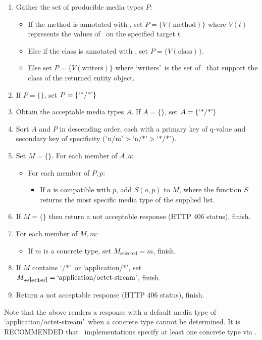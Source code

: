 \begin{enumerate}
\item Gather the set of producible media types $P$:
\begin{itemize}
\item If the method is annotated with \ProduceMime, set $P = \{ V(\mbox{method}) \}$ where $V(t)$ represents the values of \ProduceMime\ on the specified target $t$.
\item Else if the class is annotated with \ProduceMime, set $P = \{ V(\mbox{class}) \}$.
\item Else set $P = \{ V(\mbox{writers}) \}$ where \lq writers\rq\ is the set of \MsgWrite\ that support the class of the returned entity object.
\end{itemize}

\item If $P = \{\}$, set $P = \{\mbox{\lq*/*\rq}\}$

\item Obtain the acceptable media types $A$. If $A = \{\}$, set $A = \{\mbox{\lq*/*\rq}\}$

\item Sort $A$ and $P$ in descending order, each with a primary key of q-value and secondary key of specificity ($\mbox{\lq n/m\rq} > \mbox{\lq n/*\rq} > \mbox{\lq*/*\rq}$).

\item Set $M=\{\}$. For each member of $A, a$:
\begin{itemize}
\item For each member of $P, p$:
\begin{itemize}
\item If $a$ is compatible with $p$, add $S(a,p)$ to $M$, where the function $S$ returns the most specific media type of the supplied list.
\end{itemize}
\end{itemize}

\item If $M = \{\}$ then return a not acceptable response (HTTP 406 status), finish.

\item For each member of $M, m$:
\begin{itemize}
\item If $m$ is a concrete type, set $M_{\mbox{selected}} = m$, finish.
\end{itemize}

\item If $M$ contains \lq*/*\rq\ or \lq application/*\rq, set $M_{\mbox{selected}} = \mbox{\lq application/octet-stream\rq}$, finish.

\item Return a not acceptable response (HTTP 406 status), finish.
\end{enumerate}

Note that the above renders a response with a default media type of \lq application/octet-stream\rq\ when a concrete type cannot be determined. It is RECOMMENDED that \MsgWrite\ implementations specify at least one concrete type via \ProduceMime.